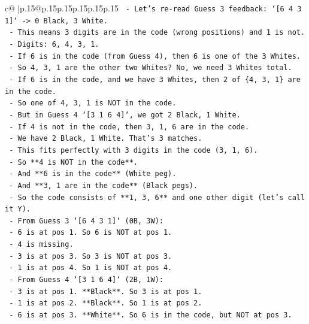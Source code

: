 \documentclass{article}
\begin{document}
{\begin{supertabular}{c@{$\;$}|p{.15\linewidth}@{}p{.15\linewidth}p{.15\linewidth}p{.15\linewidth}p{.15\linewidth}p{.15\linewidth}}
{{{\texttt{  {-} Let's re{-}read Guess 3 feedback: `{[}6 4 3 1{]}` {-}> 0 Black, 3 White.} \\
\texttt{    {-} This means 3 digits are in the code (wrong positions) and 1 is not.} \\
\texttt{    {-} Digits: 6, 4, 3, 1.} \\
\texttt{    {-} If 6 is in the code (from Guess 4), then 6 is one of the 3 Whites.} \\
\texttt{    {-} So 4, 3, 1 are the other two Whites? No, we need 3 Whites total.} \\
\texttt{    {-} If 6 is in the code, and we have 3 Whites, then 2 of \{4, 3, 1\} are in the code.} \\
\texttt{    {-} So one of 4, 3, 1 is NOT in the code.} \\
\texttt{    {-} But in Guess 4 `{[}3 1 6 4{]}`, we got 2 Black, 1 White.} \\
\texttt{      {-} If 4 is not in the code, then 3, 1, 6 are in the code.} \\
\texttt{      {-} We have 2 Black, 1 White. That's 3 matches.} \\
\texttt{      {-} This fits perfectly with 3 digits in the code (3, 1, 6).} \\
\texttt{      {-} So **4 is NOT in the code**.} \\
\texttt{      {-} And **6 is in the code** (White peg).} \\
\texttt{      {-} And **3, 1 are in the code** (Black pegs).} \\
\texttt{    {-} So the code consists of **1, 3, 6** and one other digit (let's call it Y).} \\
\texttt{    {-} From Guess 3 `{[}6 4 3 1{]}` (0B, 3W):} \\
\texttt{      {-} 6 is at pos 1. So 6 is NOT at pos 1.} \\
\texttt{      {-} 4 is missing.} \\
\texttt{      {-} 3 is at pos 3. So 3 is NOT at pos 3.} \\
\texttt{      {-} 1 is at pos 4. So 1 is NOT at pos 4.} \\
\texttt{    {-} From Guess 4 `{[}3 1 6 4{]}` (2B, 1W):} \\
\texttt{      {-} 3 is at pos 1. **Black**. So 3 is at pos 1.} \\
\texttt{      {-} 1 is at pos 2. **Black**. So 1 is at pos 2.} \\
\texttt{      {-} 6 is at pos 3. **White**. So 6 is in the code, but NOT at pos 3.} \\
}}}
\end{supertabular}}
\end{document}
